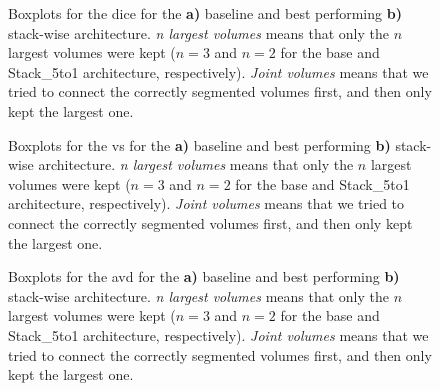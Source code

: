 \begin{figure}[htbp]
	\centering
	\hfill
	\caption[Boxplots for the \acrlong{dice} for Post-processing]{Boxplots for the \acrlong{dice} for the \textbf{a)} baseline and best performing \textbf{b)} stack-wise architecture. \textit{n largest volumes} means that only the $n$ largest volumes were kept ($n = 3$ and $n = 2$ for the base and Stack\_5to1 architecture, respectively). \textit{Joint volumes} means that we tried to connect the correctly segmented volumes first, and then only kept the largest one.}
	\label{fig:pp_boxplots_dice}  
\end{figure}

\begin{figure}[htbp]
	\centering
	\hfill
	\caption[Boxplots for the \acrlong{vs} for Post-processing]{Boxplots for the \acrlong{vs} for the \textbf{a)} baseline and best performing \textbf{b)} stack-wise architecture. \textit{n largest volumes} means that only the $n$ largest volumes were kept ($n = 3$ and $n = 2$ for the base and Stack\_5to1 architecture, respectively). \textit{Joint volumes} means that we tried to connect the correctly segmented volumes first, and then only kept the largest one.}
	\label{fig:pp_boxplots_vs}  
\end{figure}

\begin{figure}[htbp]
	\centering
	\hfill
	\caption[Boxplots for the \acrlong{avd} for Post-processing]{Boxplots for the \acrlong{avd} for the \textbf{a)} baseline and best performing \textbf{b)} stack-wise architecture. \textit{n largest volumes} means that only the $n$ largest volumes were kept ($n = 3$ and $n = 2$ for the base and Stack\_5to1 architecture, respectively). \textit{Joint volumes} means that we tried to connect the correctly segmented volumes first, and then only kept the largest one.}
	\label{fig:pp_boxplots_avd}  
\end{figure}

